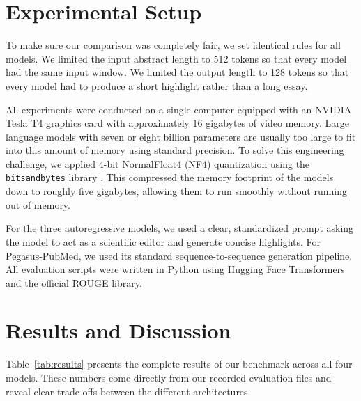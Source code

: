\documentclass[11pt,a4paper]{article}
\begin{document}
\section{Experimental Setup}
\label{sec:setup}
To make sure our comparison was completely fair, we set identical rules for all models. We limited the input abstract length to 512 tokens so that every model had the same input window. We limited the output length to 128 tokens so that every model had to produce a short highlight rather than a long essay.

All experiments were conducted on a single computer equipped with an NVIDIA Tesla T4 graphics card with approximately 16 gigabytes of video memory. Large language models with seven or eight billion parameters are usually too large to fit into this amount of memory using standard precision. To solve this engineering challenge, we applied 4-bit NormalFloat4 (NF4) quantization using the \texttt{bitsandbytes} library \cite{dettmers2023qlora}. This compressed the memory footprint of the models down to roughly five gigabytes, allowing them to run smoothly without running out of memory.

For the three autoregressive models, we used a clear, standardized prompt asking the model to act as a scientific editor and generate concise highlights. For Pegasus-PubMed, we used its standard sequence-to-sequence generation pipeline. All evaluation scripts were written in Python using Hugging Face Transformers and the official ROUGE library.

\section{Results and Discussion}
\label{sec:results}
Table~\ref{tab:results} presents the complete results of our benchmark across all four models. These numbers come directly from our recorded evaluation files and reveal clear trade-offs between the different architectures.
\end{document}
